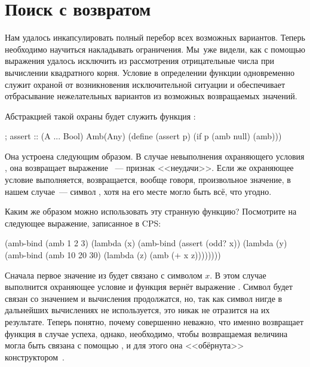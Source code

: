 \section[2]{Поиск с возвратом}%
Нам удалось инкапсулировать полный перебор всех возможных вариантов. Теперь необходимо научиться накладывать ограничения.
Мы~уже видели, как с помощью выражения  удалось исключить из рассмотрения отрицательные числа при вычислении квадратного корня. Условие в определении функции  одновременно служит охраной от возникновения исключительной ситуации и обеспечивает отбрасывание нежелательных вариантов из возможных возвращаемых значений.

Абстракцией такой охраны будет служить функция :

\begin{Definition}[emph={p}]
  ; assert :: (A ... \arrow Bool) \arrow Amb(Any)
  (define (assert p) 
    (if p (amb null) (amb)))
\end{Definition}\newpage

Она устроена следующим образом. В случае невыполнения охраняющего условия , она возвращает  выражение ~--- признак <<неудачи>>. Если же охраняющее условие выполняется, возвращается, вообще говоря, произвольное значение, в нашем случае~--- символ , хотя на его месте могло быть всё, что угодно.

Каким же образом можно использовать эту странную функцию? Посмотрите на следующее выражение, записанное в CPS:

\begin{SchemeCode}[emph={x,y,z}]
(amb-bind (amb 1 2 3) 
          (lambda (x) 
            (amb-bind (assert (odd? x))
                      (lambda (y) 
                        (amb-bind (amb 10 20 30)
                                  (lambda (z) (amb (+ x z))))))))
\end{SchemeCode}

Сначала первое значение из  будет связано с символом $x$. В этом случае выполнится охраняющее условие и функция  вернёт выражение . Символ  будет связан со значением  и вычисления продолжатся, но, так как символ  нигде в дальнейших вычислениях не используется, это никак не отразится на их результате.  Теперь понятно, почему совершенно неважно, что именно возвращает функция  в случае успеха, однако, необходимо, чтобы возвращаемая величина могла быть связана с помощью , и для этого она <<обёрнута>> конструктором~.

